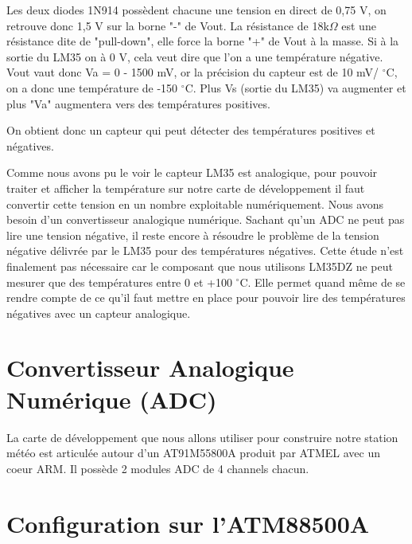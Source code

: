 \documentclass[a4paper]{report}
\begin{document}
Les deux diodes 1N914 possèdent chacune une tension en direct de 0,75 V, on retrouve donc 1,5 V sur la borne "-" de Vout.
La résistance de 18k$\Omega$ est une résistance dite de "pull-down", elle force la borne "+" de Vout à la masse.
Si à la sortie du LM35 on à 0 V, cela veut dire que l'on a une température négative.
Vout vaut donc Va = 0 -  1500 mV, or la précision du capteur est de 10 mV/ $^\circ$C, on a donc une température de -150 $^\circ$C.
Plus Vs (sortie du LM35) va augmenter et plus "Va" augmentera vers des températures positives.

On obtient donc un capteur qui peut détecter des températures positives et négatives.

Comme nous avons pu le voir le capteur LM35 est analogique, pour pouvoir traiter et afficher la température sur notre carte de développement il faut convertir cette tension en un nombre exploitable numériquement.
Nous avons besoin d'un convertisseur analogique numérique. Sachant qu'un ADC ne peut pas lire une tension négative, il reste encore à résoudre le problème de la tension négative délivrée par le LM35 pour des températures négatives. Cette étude n'est finalement pas nécessaire car le composant que nous utilisons LM35DZ ne peut mesurer que des températures entre 0 et +100 $^\circ$C. Elle permet quand même de se rendre compte de ce qu'il faut mettre en place pour pouvoir lire des températures négatives avec un capteur analogique.

\section{Convertisseur Analogique Numérique (ADC)}
La carte de développement que nous allons utiliser pour construire notre station météo est articulée autour d'un AT91M55800A produit par ATMEL avec un coeur ARM. Il possède 2 modules ADC de 4 channels chacun.

\section{Configuration sur l'ATM88500A}
\end{document}
